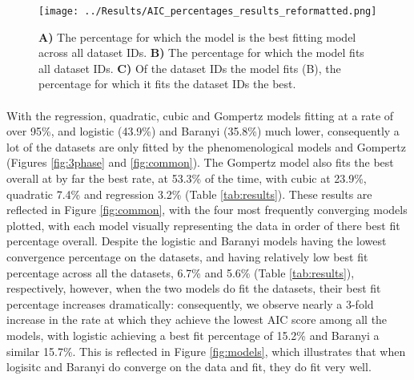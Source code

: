 \documentclass[11pt, a4paper]{article} %
\begin{document}
\begin{table}
\caption{\textbf{A)} The percentage for which the model is the best fitting model across all dataset IDs. \textbf{B)} The percentage for which the model fits all dataset IDs. \textbf{C)} Of the dataset IDs the model fits (B), the percentage for which it fits the dataset IDs the best.}
\label{tab:results}
\end{table}

\begin{SCfigure} %
\centering
\texttt{[image: ../Results/AIC\_percentages\_results\_reformatted.png]}
\caption{\textbf{A)} The percentage for which the model is the best fitting model across all dataset IDs. \textbf{B)} The percentage for which the model fits all dataset IDs. \textbf{C)} Of the dataset IDs the model fits (B), the percentage for which it fits the dataset IDs the best.}
\label{fig:barplot}
\end{SCfigure}

\paragraph{} With the regression, quadratic, cubic and Gompertz models fitting at a rate of over 95\%, and logistic (43.9\%) and Baranyi (35.8\%) much lower, consequently a lot of the datasets are only fitted by the phenomenological models and Gompertz (Figures \ref{fig:3phase} and \ref{fig:common}). The Gompertz model also fits the best overall at by far the best rate, at 53.3\% of the time, with cubic at 23.9\%, quadratic 7.4\% and regression 3.2\% (Table \ref{tab:results}). These results are reflected in Figure \ref{fig:common}, with the four most frequently converging models plotted, with each model visually representing the data in order of there best fit percentage overall. Despite the logistic and Baranyi models having the lowest convergence percentage on the datasets, and having relatively low best fit percentage across all the datasets, 6.7\% and 5.6\% (Table \ref{tab:results}), respectively, however, when the two models do fit the datasets, their best fit percentage increases dramatically: consequently, we observe nearly a 3-fold increase in the rate at which they achieve the lowest AIC score among all the models, with logistic achieving a best fit percentage of 15.2\% and Baranyi a similar 15.7\%. This is reflected in Figure \ref{fig:models}, which illustrates that when logisitc and Baranyi do converge on the data and fit, they do fit very well.
\end{document}
